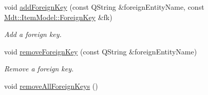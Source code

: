 \begin{DoxyCompactItemize}
\item 
void \hyperlink{class_mdt_1_1_item_model_1_1_foreign_key_proxy_model_map_ac0cbe6136460449e0cb89c562ba57967}{add\+Foreign\+Key} (const Q\+String \&foreign\+Entity\+Name, const \hyperlink{class_mdt_1_1_item_model_1_1_foreign_key}{Mdt\+::\+Item\+Model\+::\+Foreign\+Key} \&fk)
\begin{DoxyCompactList}\small\item\em Add a foreign key. \end{DoxyCompactList}\item 
void \hyperlink{class_mdt_1_1_item_model_1_1_foreign_key_proxy_model_map_ad50a0a9b87d4b12fef9684d709f98573}{remove\+Foreign\+Key} (const Q\+String \&foreign\+Entity\+Name)
\begin{DoxyCompactList}\small\item\em Remove a foreign key. \end{DoxyCompactList}\item 
void \hyperlink{class_mdt_1_1_item_model_1_1_foreign_key_proxy_model_map_a9ab589f729105935603c79360b66dc95}{remove\+All\+Foreign\+Keys} ()\hypertarget{class_mdt_1_1_item_model_1_1_foreign_key_proxy_model_map_a9ab589f729105935603c79360b66dc95}{}\label{class_mdt_1_1_item_model_1_1_foreign_key_proxy_model_map_a9ab589f729105935603c79360b66dc95}


\end{DoxyCompactItemize}
